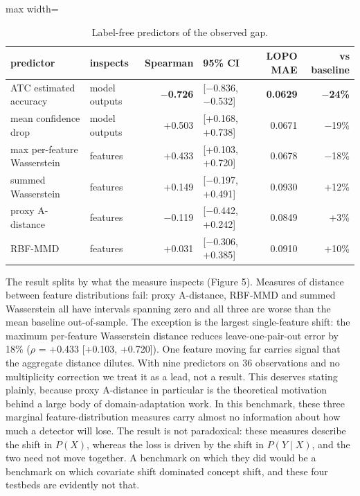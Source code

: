 \documentclass[preprint,12pt,nopreprintline]{elsarticle}
\begin{document}
\begin{table}[htbp]\centering\scriptsize
\caption{Label-free predictors of the observed gap.}
\begin{adjustbox}{max width=\textwidth}\begin{tabular}{llrlrr}
\toprule
predictor & inspects & Spearman & 95\% CI & LOPO MAE & vs baseline \\
\midrule
ATC estimated accuracy & model outputs & \textbf{$-$0.726} & [$-$0.836, $-$0.532] & \textbf{0.0629} & \textbf{$-$24\%} \\
mean confidence drop & model outputs & +0.503 & [+0.168, +0.738] & 0.0671 & $-$19\% \\
max per-feature Wasserstein & features & +0.433 & [+0.103, +0.720] & 0.0678 & $-$18\% \\
summed Wasserstein & features & +0.149 & [$-$0.197, +0.491] & 0.0930 & +12\% \\
proxy A-distance & features & $-$0.119 & [$-$0.442, +0.242] & 0.0849 & +3\% \\
RBF-MMD & features & +0.031 & [$-$0.306, +0.385] & 0.0910 & +10\% \\
\bottomrule
\end{tabular}\end{adjustbox}
\end{table}

The result splits by what the measure inspects (Figure 5). Measures of distance between feature distributions fail: proxy A-distance, RBF-MMD and summed Wasserstein all have intervals spanning zero and all three are worse than the mean baseline out-of-sample. The exception is the largest single-feature shift: the maximum per-feature Wasserstein distance reduces leave-one-pair-out error by 18\% ($\rho$ = +0.433 [+0.103, +0.720]). One feature moving far carries signal that the aggregate distance dilutes. With nine predictors on 36 observations and no multiplicity correction we treat it as a lead, not a result. This deserves stating plainly, because proxy A-distance in particular is the theoretical motivation behind a large body of domain-adaptation work. In this benchmark, these three marginal feature-distribution measures carry almost no information about how much a detector will lose. The result is not paradoxical: these measures describe the shift in $P(X)$, whereas the loss is driven by the shift in $P(Y \mid X)$, and the two need not move together. A benchmark on which they did would be a benchmark on which covariate shift dominated concept shift, and these four testbeds are evidently not that.
\end{document}
